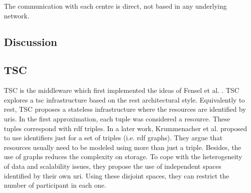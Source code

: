 The communication with each centre is direct, not based in any underlying network. %









\subsection{Discussion}






\subsection{TSC}
TSC \citep{fensel_tsc_2007} is the middleware which first implemented the ideas of Fensel et al. \citep{fensel_triple-space_2004}.
TSC explores a \acl{tsc} infrastructure based on the \ac{rest} architectural style.
Equivalently to \ac{rest}, TSC proposes a stateless infrastructure where the resources are identified by \acp{uri}.
In the first approximation, each tuple was considered a resource.
These tuples correspond with \ac{rdf} triples.
In a later work,  Krummenacher et al. \citep{krummenacher2006specification} proposed to use identifiers just for a set of triples (i.e. \ac{rdf} graphs).
They argue that resources usually need to be modeled using more than just a triple.
Besides, the use of graphs reduces the complexity on storage.
To cope with the heterogeneity of data and scalability issues, they propose the use of independent spaces identified by their own \ac{uri}.
Using these disjoint spaces, they can restrict the number of participant in each one.


